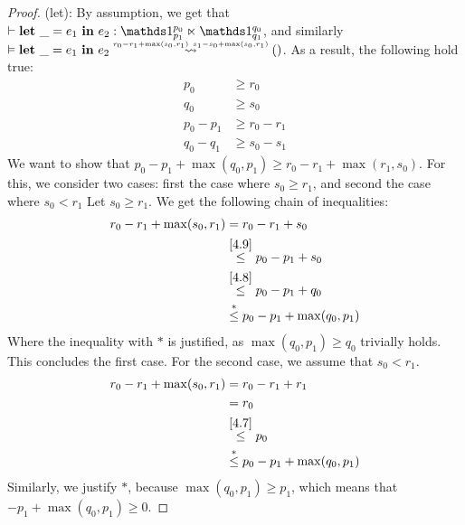 \begin{proof}
   (let): By assumption, we get that \(\typing{}{\letexp{\_}{e_1}{e_2}}{\ratype{\unit}{p_0}{p_1} \ltimes \ratype{\unit}{q_0}{q_1}}\), and similarly \(\evals{}{\letexp{\_}{e_1}{e_2}}{()}{r_0 - r_1 + \max(s_0, r_1)}{s_1 - s_0 + \max(s_0, r_1)}\). As a result, the following hold true:
   \begin{align}
      p_0         &\geq r_0 \label{4.7}\\
      q_0         &\geq s_0 \label{4.8} \\
      p_0 - p_1   &\geq r_0 - r_1 \label{4.9} \\
      q_0 - q_1   &\geq s_0 - s_1 \label{4.10}
   \end{align}
   We want to show that \(p_0 - p_1 + \max(q_0, p_1) \geq r_0 - r_1 + \max(r_1, s_0)\). For this, we consider two cases: first the case where \(s_0 \geq r_1\), and second the case where \(s_0 < r_1\)
   Let \(s_0 \geq r_1\). We get the following chain of inequalities:
   \begin{align*}
      r_0 - r_1 + \max(s_0, r_1) &= r_0 - r_1 + s_0 \\
                                 &\stackrel{\ref{4.9}}{\leq}p_0 - p_1 + s_0\\
                                 &\stackrel{\ref{4.8}}{\leq}p_0 - p_1 + q_0\\
                                 &\stackrel{*}{\leq}p_0 - p_1 + \max(q_0, p_1)
   \end{align*}
   Where the inequality with \(*\) is justified, as \(\max(q_0, p_1) \geq q_0\) trivially holds. This concludes the first case.
   For the second case, we assume that \(s_0 < r_1\). 
   \begin{align*}
      r_0 - r_1 + \max(s_0, r_1) &= r_0 - r_1 + r_1 \\
                                 &= r_0 \\
                                 &\stackrel{\ref{4.7}}{\leq} p_0\\
                                 &\stackrel{*}{\leq} p_0 - p_1 + \max(q_0, p_1)
   \end{align*}
   Similarly, we justify \(*\), because \(\max(q_0, p_1) \geq p_1\), which means that \(-p_1 + \max(q_0, p_1) \geq 0\). 
\end{proof}
